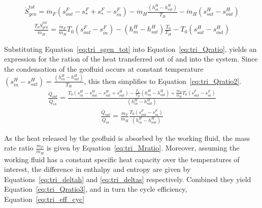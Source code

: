         \begin{align}
            \Dot{S}_{gen}^{tot} = \Dot{m}_{F}(s_{out}^{F}-s_{*}^{F} + s_{*}^{F}-s_{in}^{F}) - \Dot{m}_{H} \frac{(h_{in}^{H}-h_{sat}^{H})}{T_H} - \Dot{m}_{H}(s_{sat}^{H}-s_{out}^{H})
        \end{align}
        \begin{align}
            \frac{T_0\Dot{S}_{gen}^{tot}}{\Dot{m}_{H}} = \frac{\Dot{m}_{F}}{\Dot{m}_{H}}T_0(s_{out}^{F}-s_{in}^{F}) - (h_{in}^{H}-h_{sat}^{H})\frac{T_0}{T_H} - T_0(s_{sat}^{H}-s_{out}^{H}) \label{eq:tri_sgen_tot}
        \end{align}

        Substituting Equation~\ref{eq:tri_sgen_tot} into Equation~\ref{eq:tri_Qratio}, yields an expression for the ration of the heat transferred out of and into the system. Since the condensation of the geofluid occurs at constant temperature \((s_{in}^{H}-s_{sat}^{H})=\frac{(h_{in}^{H}-h_{sat}^{H})}{T_H}\), this then simplifies to Equation~\ref{eq:tri_Qratio2}.
        \begin{align}
            \frac{\Dot{Q}_{out}}{\Dot{Q}_{in}} = \frac{T_0(s_{in}^{H}-s_{out}^{H} - s_{sat}^{H}+s_{out}^{H}) - \frac{T_0}{T_{H}}(h_{in}^{H}-h_{sat}^{H}) + \frac{\Dot{m}_{F}}{\Dot{m}_{H}}T_0(s_{out}^{F}-s_{in}^{F})}{(h_{in}^{H}-h_{out}^{H})}
        \end{align}
        \begin{align}
            \frac{\Dot{Q}_{out}}{\Dot{Q}_{in}} = \frac{\Dot{m}_{F}}{\Dot{m}_{H}}\frac{T_0(s_{out}^{F}-s_{in}^{F})}{(h_{in}^{H}-h_{out}^{H})} \label{eq:tri_Qratio2}
        \end{align}
        
        As the heat released by the geofluid is absorbed by the working fluid, the mass rate ratio \(\frac{\Dot{m}_{F}}{\Dot{m}_{H}}\) is given by Equation~\ref{eq:tri_Mratio}. Moreover, assuming the working fluid has a constant specific heat capacity over the temperatures of interest, the difference in enthalpy and entropy are given by Equations~\ref{eq:tri_deltah} and \ref{eq:tri_deltas} respectively. Combined they yield Equation~\ref{eq:tri_Qratio3}, and in turn the cycle efficiency, Equation~\ref{eq:tri_eff_cyc}

